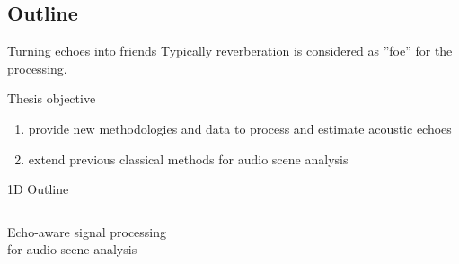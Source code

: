 \subsection{Outline}

\begin{frame}
    \begin{block}{Turning echoes into friends}
        Typically reverberation is considered as ''foe'' for the processing.
    \end{block}

    \begin{mydefblock}{Thesis objective}
        \begin{enumerate}
        \item provide new methodologies and data to process and estimate acoustic echoes
            \item extend previous classical methods for audio scene analysis
        \end{enumerate}
    \end{mydefblock}

\end{frame}

\begin{frame}[standout]{1D Outline}
    \begin{columns}
        \begin{column}{0.35\textwidth}
            Echo-aware signal processing
            \\for audio scene analysis
        \end{column}
        \begin{column}{0.05\textwidth}
        \end{column}
        \begin{column}{0.6\textwidth}
            {
                \tableofcontents
            }
        \end{column}
    \end{columns}
\end{frame}